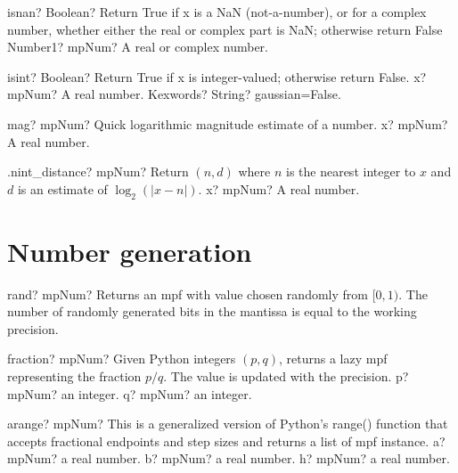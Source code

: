 \documentclass[12pt,a4paper,openany]{book}
\begin{document}
\begin{mpFunctionsExtract}
\mpFunctionOne
{isnan? Boolean?  Return True if x is a NaN (not-a-number), or for a complex number, whether either the real or complex part is NaN; otherwise return False}
{Number1? mpNum? A real or complex number.}
\end{mpFunctionsExtract}

\begin{mpFunctionsExtract}
\mpFunctionTwo
{isint? Boolean? Return True if x is integer-valued; otherwise return False.}
{x? mpNum? A real number.}
{Kexwords? String? gaussian=False.}
\end{mpFunctionsExtract}

\begin{mpFunctionsExtract}
\mpFunctionOne
{mag? mpNum? Quick logarithmic magnitude estimate of a number.}
{x? mpNum? A real number.}
\end{mpFunctionsExtract}

\begin{mpFunctionsExtract}
\mpFunctionOne
{.nint\_distance? mpNum? Return $(n,d)$ where $n$ is the nearest integer to $x$ and $d$ is an estimate of $\log_2(|x-n|)$.}
{x? mpNum? A real number.}
\end{mpFunctionsExtract}

\section{Number generation}

\begin{mpFunctionsExtract}
\mpFunctionZero
{rand? mpNum? Returns an mpf with value chosen randomly from $[0,1)$. The number of randomly generated bits in the mantissa is equal to the working precision.}
\end{mpFunctionsExtract}

\begin{mpFunctionsExtract}
\mpFunctionTwo
{fraction? mpNum?  Given Python integers $(p,q)$, returns a lazy mpf representing the fraction $p/q$. The value is updated with the precision.}
{p? mpNum? an integer.}
{q? mpNum? an integer.}
\end{mpFunctionsExtract}

\begin{mpFunctionsExtract}
\mpFunctionThree
{arange? mpNum?  This is a generalized version of Python's range() function that accepts fractional endpoints and step sizes and returns a list of mpf instance.}
{a? mpNum? a real number.}
{b? mpNum? a real number.}
{h? mpNum? a real number.}
\end{mpFunctionsExtract}
\end{document}
